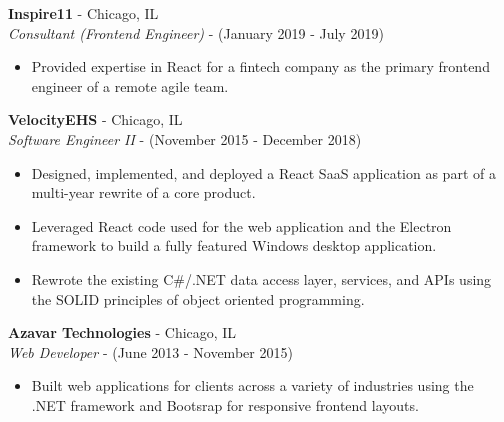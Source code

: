 \documentclass[10pt]{article}
\begin{document}
\begin{paracol}{2}
    \noindent \textbf{Inspire11} - Chicago, IL \\
    \textit{Consultant (Frontend Engineer)} - {\footnotesize{(January 2019 - July 2019)}}
    \begin{itemize}
        \item Provided expertise in React for a fintech company as the primary frontend engineer of a remote agile team.
    \end{itemize}

    \noindent \textbf{VelocityEHS} - Chicago, IL \\
    \textit{Software Engineer II} - {\footnotesize{(November 2015 - December 2018)}}
    \begin{itemize}
        \item Designed, implemented, and deployed a React SaaS application as part of a multi-year rewrite of a core product.
        \item Leveraged React code used for the web application and the Electron framework to build a fully featured Windows desktop application.
        \item Rewrote the existing C\#/.NET data access layer, services, and APIs using the SOLID principles of object oriented programming.
    \end{itemize}

    \noindent \textbf{Azavar Technologies} - Chicago, IL \\
    \textit{Web Developer} - {\footnotesize(June 2013 - November 2015)}
    \begin{itemize}
        \item Built web applications for clients across a variety of industries using the .NET framework and Bootsrap for responsive frontend layouts.
    \end{itemize}

\end{paracol}
\end{document}

